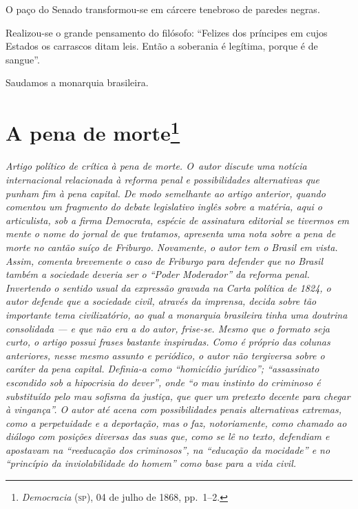 O paço do Senado transformou-se em cárcere tenebroso de paredes negras.

Realizou-se o grande pensamento do filósofo: ``Felizes dos príncipes em
cujos Estados os carrascos ditam leis. Então a soberania é legítima,
porque é de sangue''.

Saudamos a monarquia brasileira.

\chapter{A pena de morte\footnote{\emph{Democracia} (\textsc{sp}), 04 de julho de 1868, pp.~1--2.}}

\begin{didascalia}\itshape
Artigo político de crítica à pena de morte. O~autor discute uma notícia
internacional relacionada à reforma penal e possibilidades alternativas
que punham fim à pena capital. De modo semelhante ao artigo anterior,
quando comentou um fragmento do debate legislativo inglês sobre a
matéria, aqui o articulista, sob a firma \textnormal{Democrata}, espécie de
assinatura editorial se tivermos em mente o nome do jornal de que
tratamos, apresenta uma nota sobre a pena de morte no cantão suíço de
Friburgo. Novamente, o autor tem o Brasil em vista. Assim, comenta
brevemente o caso de Friburgo para defender que no Brasil também a
sociedade deveria ser o ``Poder Moderador'' da reforma penal. Invertendo o
sentido usual da expressão gravada na Carta política de 1824, o autor
defende que a sociedade civil, através da imprensa, decida sobre tão
importante tema civilizatório, ao qual a monarquia brasileira tinha uma
doutrina consolidada --- e que não era a do autor, frise-se. Mesmo que o
formato seja curto, o artigo possui frases bastante inspiradas. Como é
próprio das colunas anteriores, nesse mesmo assunto e periódico, o autor
não tergiversa sobre o caráter da pena capital. Definia-a como
``homicídio jurídico''; ``assassinato escondido sob a hipocrisia do dever'',
onde ``o mau instinto do criminoso é substituído pelo mau sofisma da
justiça, que quer um pretexto decente para chegar à vingança''. O autor
até acena com possibilidades penais alternativas extremas, como a
perpetuidade e a deportação, mas o faz, notoriamente, como chamado ao
diálogo com posições diversas das suas que, como se lê no texto,
defendiam e apostavam na ``reeducação dos criminosos'', na ``educação da
mocidade'' e no ``princípio da inviolabilidade do homem'' como base para a
vida civil.
\end{didascalia}



